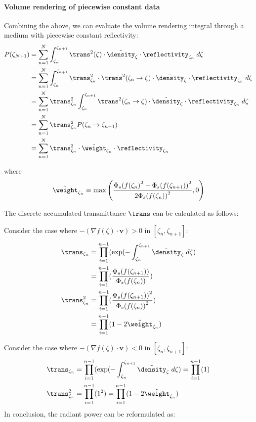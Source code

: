 \paragraph{Volume rendering of piecewise constant data}
Combining the above, we can evaluate the volume rendering integral through a medium with piecewise constant reflectivity:
% 
\begin{align}
P(\zeta_{N+1}) &= \sum_{n=1}^N \int_{\zeta_n}^{\zeta_{n+1}} \trans^2(\zeta) \cdot \tilde{\density}_{\zeta} \cdot \reflectivity_{\zeta_n} \; d\zeta
\\
&= \sum_{n=1}^N \int_{\zeta_n}^{\zeta_{n+1}} \trans^2_{\zeta_n} \cdot \trans^2(\zeta_n \rightarrow \zeta) \cdot \tilde{\density}_{\zeta} \cdot \reflectivity_{\zeta_n} \; d\zeta 
\\
&= \sum_{n=1}^N \trans^2_{\zeta_n}  \int_{\zeta_n}^{\zeta_{n+1}} \trans^2(\zeta_n \rightarrow \zeta) \cdot \tilde{\density}_{\zeta} \cdot \reflectivity_{\zeta_n} \; d\zeta 
\\
&=\sum_{n=1}^N \trans^2_{\zeta_n} P(\zeta_n \rightarrow \zeta_{n+1})
\\
&= \sum_{n=1}^N \trans^2_{\zeta_n} \cdot \tilde{\weight}_{\zeta_n} \cdot \reflectivity_{\zeta_n}
\end{align}

where 
\begin{align}
\tilde{\weight}_{\zeta_n} \equiv \max\left(\frac{{\Phi_s(f(\zeta_n)}^2 -{\Phi_s(f(\zeta_{n+1}))}^2}{{2\Phi_s(f(\zeta_n))}^2},0\right)
\end{align}

The discrete accumulated transmittance $\trans$ can be calculated as follows:

Consider the case where $-(\nabla f(\zeta)\cdot \mathbf{v}) > 0$ in $[\zeta_n, \zeta_{n+1}]$: 
%
\begin{align}
\trans_{\zeta_n} 
&=\prod_{i=1}^{n-1}(\exp(-\int_{\zeta_n}^{\zeta_{n+1}}\tilde{\density}_\zeta \; d\zeta) \\
&= \prod_{i=1}^{n-1}(\frac{\Phi_s(f(\zeta_{n+1}))}{\Phi_s(f(\zeta_n))})\\
\trans^2_{\zeta_n}
&= \prod_{i=1}^{n-1}(\frac{{\Phi_s(f(\zeta_{n+1}))}^2}{{\Phi_s(f(\zeta_n))}^2})\\
&= \prod_{i=1}^{n-1}(1-2\tilde{\weight}_{\zeta_n})
\label{eq:dicrete_transmittance}
\end{align}

Consider the case where $-(\nabla f(\zeta)\cdot \mathbf{v}) < 0$ in $[\zeta_n, \zeta_{n+1}]$: 
\begin{align}
\trans_{\zeta_n} 
&=\prod_{i=1}^{n-1}(\exp(-\int_{\zeta_n}^{\zeta_{n+1}}\tilde{\density}_\zeta \; d\zeta) = \prod_{i=1}^{n-1}(1)
\\
\trans^2_{\zeta_n} &= \prod_{i=1}^{n-1}(1^2) = \prod_{i=1}^{n-1}(1-2\tilde{\weight}_{\zeta_n})
\end{align}
In conclusion, the radiant power can be reformulated as:

